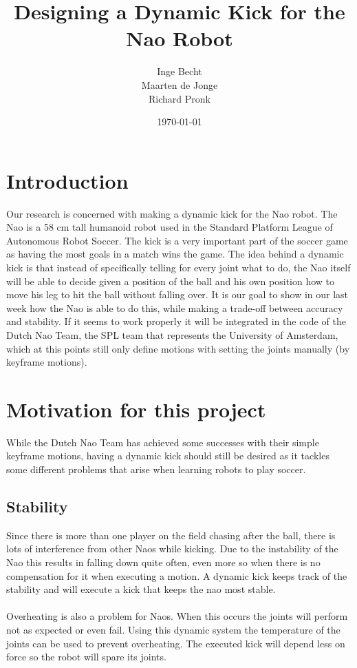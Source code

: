 \documentclass[a4paper]{article}
\begin{document}
\title{Designing a Dynamic Kick for the Nao Robot}
\author{Inge Becht \\ Maarten de Jonge \\ Richard Pronk}
\date{\today}
\maketitle

\section{Introduction}
Our research is concerned with making a dynamic kick for the Nao robot. The
Nao is a 58 cm tall humanoid robot used in the Standard Platform League of
Autonomous Robot Soccer. The kick is a very important part of the soccer game as
having the most goals in a match wins the game. The idea behind a dynamic kick
is that instead of specifically telling for every joint what to do, the Nao
itself will be able to decide given a position of the ball and his own position
how to move his leg to hit the ball without falling over. It is our goal to show
in our last week how the Nao is able to do this, while making a trade-off
between accuracy and stability. If it seems to work properly it will be
integrated in the code of the Dutch Nao Team, the SPL team that represents the
University of Amsterdam, which at this points still only 
define motions with setting the 
joints manually (by keyframe motions).

\section{Motivation for this project} 
While the Dutch Nao Team has achieved some successes with their simple
keyframe motions, having a dynamic kick should still be desired as it tackles
some different problems that arise when learning robots to play soccer. 


\subsection{Stability}
Since there is more than one player on
the field  chasing after the ball,
there is lots of interference from other Naos while kicking. Due to the
instability of the Nao this results in falling down quite often, even more
so when there is no compensation for it when executing a motion. A dynamic
kick keeps track of the stability and will execute a kick that keeps the nao
most stable.
\\\\
Overheating is also a problem for Naos. When this occurs the joints will perform
not as expected or even fail. Using this dynamic system the temperature of the
joints can be used to prevent overheating. The executed kick will depend less
on force so the robot will spare its joints.
\end{document}
